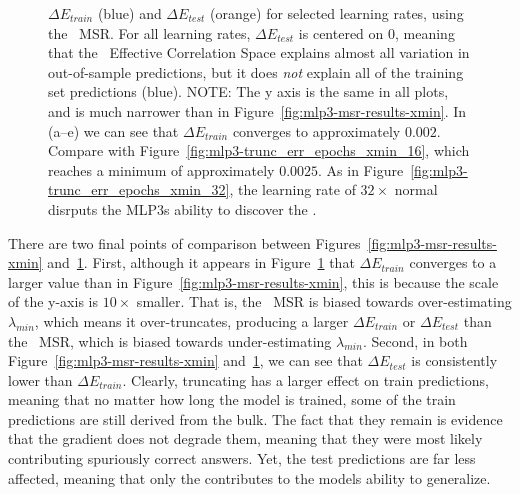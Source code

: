 \begin{figure}[t]
{        \label{fig:mlp3-trunc_err_epochs_detX_16}
    }
    \caption{
        $\Delta E_{train}$ (blue) and $\Delta E_{test}$ (orange) for selected learning rates, using the \TRACELOG~MSR. 
        For all learning rates, $\Delta E_{test}$ is centered on $0$, meaning that the \TRACELOG~Effective Correlation 
        Space explains almost all variation in out-of-sample predictions, but it does \emph{not} explain all of the 
        training set predictions (blue). NOTE: The y axis is the same in all plots, and is much narrower than in 
        Figure~\ref{fig:mlp3-msr-results-xmin}. In (a--e) we can see that $\Delta E_{train}$ converges to approximately 
        $0.002$. Compare with Figure~\ref{fig:mlp3-trunc_err_epochs_xmin_16}, which reaches a minimum of approximately 
        $0.0025$. As in Figure~\ref{fig:mlp3-trunc_err_epochs_xmin_32}, the learning rate of $32\times$ normal disrputs the 
        MLP3s ability to discover the \TRACELOG \EffectiveCorrelationSpace.
    }
    \label{fig:mlp3-msr-results-detX}
\end{figure}


There are two final points of comparison between Figures~\ref{fig:mlp3-msr-results-xmin} and~\ref{fig:mlp3-msr-results-detX}.
%
First, 
although it appears in Figure~\ref{fig:mlp3-msr-results-detX} that $\Delta E_{train}$ converges to a larger value than in Figure~\ref{fig:mlp3-msr-results-xmin}, this is because the scale of the y-axis is $10\times$ smaller. 
That is, the \POWERLAW~MSR is biased towards over-estimating $\lambda_{min}$, which means it over-truncates, producing a 
larger $\Delta E_{train}$ or $\Delta E_{test}$ 
than the \TRACELOG~MSR, which is biased towards under-estimating $\lambda_{min}$. 
%
Second,
in both Figure~\ref{fig:mlp3-msr-results-xmin} and~\ref{fig:mlp3-msr-results-detX}, we can see that $\Delta E_{test}$ is consistently lower than $\Delta E_{train}$. 
Clearly, truncating has a larger effect on train predictions, meaning that no matter how long the model is trained, some 
of the train predictions are still derived from the bulk. The fact that they remain is evidence that the gradient does not degrade them, meaning that they were most likely contributing spuriously correct answers. Yet, the test predictions are far less affected, meaning that only the \EffectiveCorrelationSpace contributes to the models ability to generalize.

